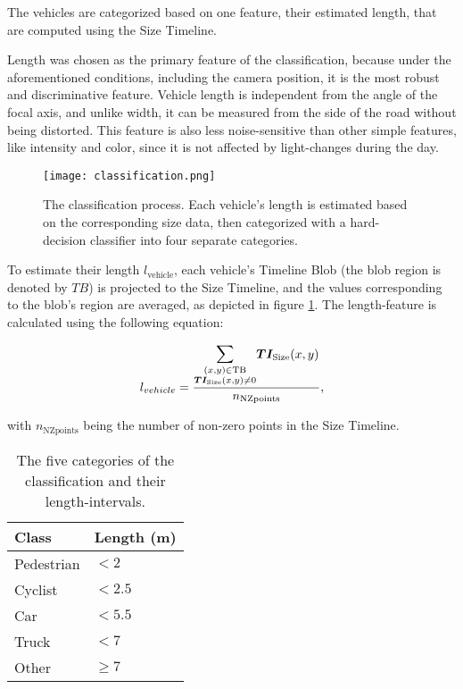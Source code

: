 The vehicles are categorized based on one feature, their estimated length, that are computed using the Size Timeline.

Length was chosen as the primary feature of the classification, because under the aforementioned conditions, including the camera position, it is the most robust and discriminative feature.
Vehicle length is independent from the angle of the focal axis, and unlike width, it can be measured from the side of the road without being distorted.
This feature is also less noise-sensitive than other simple features, like intensity and color, since it is not affected by light-changes during the day.

\begin{figure}[!h]
	\centering
	\texttt{[image: classification.png]}
	\caption[The classifier's operation]{The classification process. Each vehicle's length is estimated based on the corresponding size data, then categorized with a hard-decision classifier into four separate categories. \label{fig:classification}}
\end{figure}

To estimate their length $l_{\text{vehicle}}$, each vehicle's Timeline Blob (the blob region is denoted by $TB$) is projected to the Size Timeline, and the values corresponding to the blob's region are averaged, as depicted in figure \ref{fig:classification}. 
The length-feature is calculated using the following equation:

\begin{displaymath}
	l_{vehicle} = \frac{\mathlarger{\mathlarger{\sum}}\limits_{\substack{(x,y) \in \text{TB} \\ \boldsymbol{TI_{\text{Size}}}(x,y)\neq 0}} \boldsymbol{TI_{\text{Size}}}(x,y)}{n_{\text{NZpoints}}},
\end{displaymath}

with $n_{\text{NZpoints}}$ being the number of non-zero points in the Size Timeline.

\begin{table}[!h]
	\centering
	\begin{tabular}{ll}
		\toprule
		\textbf{Class} & \textbf{Length (m)} \\
		\midrule
		Pedestrian     & $< 2$               \\
		Cyclist        & $< 2.5$             \\
		Car            & $< 5.5$             \\
		Truck          & $< 7$               \\
		Other          & $ \geq 7$    \\
		\bottomrule          
	\end{tabular}
\caption{The five categories of the classification and their length-intervals.}
\label{tab:intervals}
\end{table}

